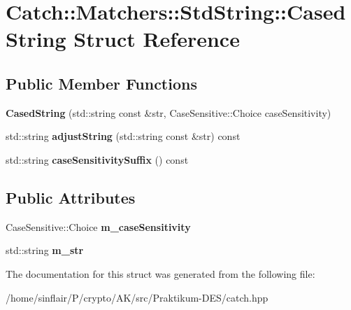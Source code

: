 \hypertarget{structCatch_1_1Matchers_1_1StdString_1_1CasedString}{}\section{Catch\+:\+:Matchers\+:\+:Std\+String\+:\+:Cased\+String Struct Reference}
\label{structCatch_1_1Matchers_1_1StdString_1_1CasedString}
\subsection*{Public Member Functions}
\begin{DoxyCompactItemize}
\item 
\mbox{\label{structCatch_1_1Matchers_1_1StdString_1_1CasedString_aa88bbc5acd2bff22351d8d4b1816b561}} 
{\bfseries Cased\+String} (std\+::string const \&str, Case\+Sensitive\+::\+Choice case\+Sensitivity)
\item 
\mbox{\label{structCatch_1_1Matchers_1_1StdString_1_1CasedString_a77639b1165c01f424ee0e96f53335010}} 
std\+::string {\bfseries adjust\+String} (std\+::string const \&str) const
\item 
\mbox{\label{structCatch_1_1Matchers_1_1StdString_1_1CasedString_a9759155344d696b2476d764a1d95fcc9}} 
std\+::string {\bfseries case\+Sensitivity\+Suffix} () const
\end{DoxyCompactItemize}
\subsection*{Public Attributes}
\begin{DoxyCompactItemize}
\item 
\mbox{\label{structCatch_1_1Matchers_1_1StdString_1_1CasedString_ae1c2864c986941536a6e94cca0528f92}} 
Case\+Sensitive\+::\+Choice {\bfseries m\+\_\+case\+Sensitivity}
\item 
\mbox{\label{structCatch_1_1Matchers_1_1StdString_1_1CasedString_ad05dbc99aba3c3c386d6b856b213f911}} 
std\+::string {\bfseries m\+\_\+str}
\end{DoxyCompactItemize}


The documentation for this struct was generated from the following file\+:\begin{DoxyCompactItemize}
\item 
/home/sinflair/\+P/crypto/\+A\+K/src/\+Praktikum-\/\+D\+E\+S/catch.\+hpp\end{DoxyCompactItemize}
